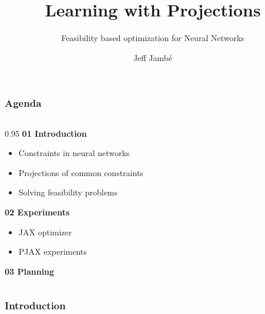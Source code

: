 \documentclass[t, xcolor=table, aspectratio=169]{beamer}
\title{Learning with Projections}
\subtitle{Feasibility based optimization for Neural Networks}
\institute{Promotor: Panos Patrinos, Daily Supervisor: Jan Quan}
\author{Jeff Jambé}
\begin{document}
    \begin{frame}
        \titlepage
    \end{frame}

    \begin{frame}
        \frametitle{Agenda}
        \vspace{-1.5em}
        \begin{columns}[onlytextwidth,T]
             \begin{column}{0.95\textwidth}
                \large
                \textbf{01 Introduction}
                \begin{itemize}
                    \normalsize
                    \setlength\itemsep{0.2em}
                    \item Constraints in neural networks
                    \item Projections of common constraints
                    \item Solving feasibility problems
                \end{itemize}
                \vspace{0.8em}
                \textbf{02 Experiments}\\
                \small
                \begin{itemize}
                    \item JAX optimizer
                    \item PJAX experiments
                \end{itemize}
                \vspace{0.8em}
                \large
                \textbf{03 Planning}\\
            \end{column}
        \end{columns}
    \end{frame}

    \begin{frame}
        \frametitle{Introduction}
    \end{frame}
\end{document}
